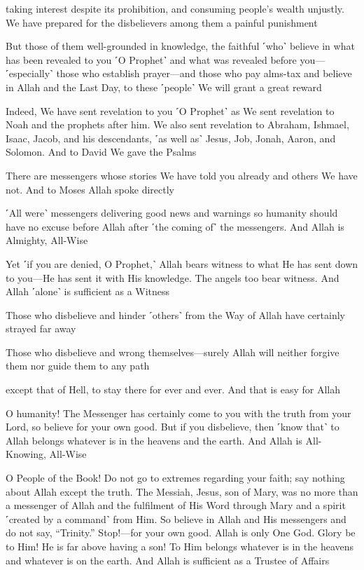 taking interest despite its prohibition, and consuming people’s wealth unjustly. We have prepared for the disbelievers among them a painful punishment

But those of them well-grounded in knowledge, the faithful ˹who˺ believe in what has been revealed to you ˹O Prophet˺ and what was revealed before you—˹especially˺ those who establish prayer—and those who pay alms-tax and believe in Allah and the Last Day, to these ˹people˺ We will grant a great reward

Indeed, We have sent revelation to you ˹O Prophet˺ as We sent revelation to Noah and the prophets after him. We also sent revelation to Abraham, Ishmael, Isaac, Jacob, and his descendants, ˹as well as˺ Jesus, Job, Jonah, Aaron, and Solomon. And to David We gave the Psalms

There are messengers whose stories We have told you already and others We have not. And to Moses Allah spoke directly

˹All were˺ messengers delivering good news and warnings so humanity should have no excuse before Allah after ˹the coming of˺ the messengers. And Allah is Almighty, All-Wise

Yet ˹if you are denied, O Prophet,˺ Allah bears witness to what He has sent down to you—He has sent it with His knowledge. The angels too bear witness. And Allah ˹alone˺ is sufficient as a Witness

Those who disbelieve and hinder ˹others˺ from the Way of Allah have certainly strayed far away

Those who disbelieve and wrong themselves—surely Allah will neither forgive them nor guide them to any path

except that of Hell, to stay there for ever and ever. And that is easy for Allah

O humanity! The Messenger has certainly come to you with the truth from your Lord, so believe for your own good. But if you disbelieve, then ˹know that˺ to Allah belongs whatever is in the heavens and the earth. And Allah is All-Knowing, All-Wise

O People of the Book! Do not go to extremes regarding your faith; say nothing about Allah except the truth. The Messiah, Jesus, son of Mary, was no more than a messenger of Allah and the fulfilment of His Word through Mary and a spirit ˹created by a command˺ from Him. So believe in Allah and His messengers and do not say, “Trinity.” Stop!—for your own good. Allah is only One God. Glory be to Him! He is far above having a son! To Him belongs whatever is in the heavens and whatever is on the earth. And Allah is sufficient as a Trustee of Affairs

